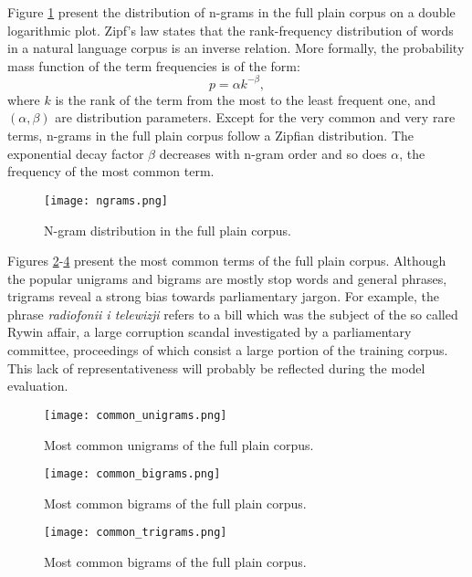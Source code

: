 Figure \ref{figure:ngramdistribution} present the distribution of n-grams in the full plain corpus on a double logarithmic plot. Zipf's law states that the rank-frequency distribution of words in a natural language corpus is an inverse relation. More formally, the probability mass function of the term frequencies is of the form:
\begin{equation}
	p=\alpha k^{-\beta},
	\label{equation:zipf}
\end{equation}
where $k$ is the rank of the term from the most to the least frequent one, and $(\alpha, \beta)$ are distribution parameters. Except for the very common and very rare terms, n-grams in the full plain corpus follow a Zipfian distribution. The exponential decay factor $\beta$ decreases with n-gram order and so does $\alpha$, the frequency of the most common term.

\begin{figure}[!htbp]
	  \centering
	  \texttt{[image: ngrams.png]}
      \caption{N-gram distribution in the full plain corpus.}
      \label{figure:ngramdistribution}
\end{figure}

Figures \ref{figure:commonunigrams}-\ref{figure:commontrigrams} present the most common terms of the full plain corpus. Although the popular unigrams and bigrams are mostly stop words and general phrases, trigrams reveal a strong bias towards parliamentary jargon. For example, the phrase \textit{radiofonii i telewizji} refers to a bill which was the subject of the so called Rywin affair, a large corruption scandal investigated by a parliamentary committee, proceedings of which consist a large portion of the training corpus. This lack of representativeness will probably be reflected during the model evaluation.
\begin{figure}[!htbp]
	  \centering
	  \texttt{[image: common\_unigrams.png]}
	      \caption{Most common unigrams of the full plain corpus.}
	      \label{figure:commonunigrams}
\end{figure}

\begin{figure}[!htbp]
	  \centering
	  \texttt{[image: common\_bigrams.png]}
	      \caption{Most common bigrams of the full plain corpus.}
	      \label{figure:commonbigrams}
\end{figure}

\begin{figure}[!htbp]
	  \centering
	  \texttt{[image: common\_trigrams.png]}
	      \caption{Most common bigrams of the full plain corpus.}
	      \label{figure:commontrigrams}
\end{figure}
